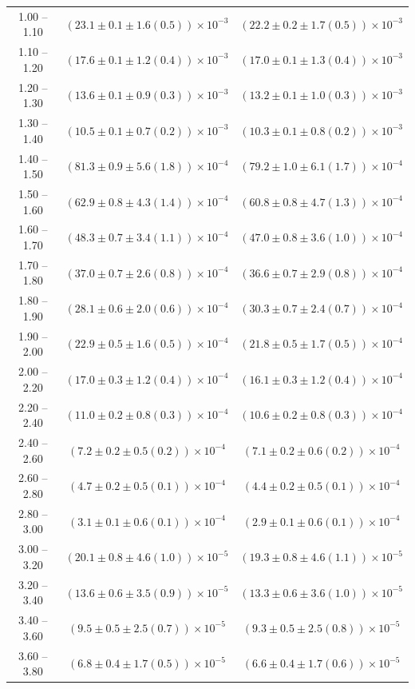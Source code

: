 \begin{table}
\begin{center}
\begin{tabular}{ c | c c }
1.00 -- 1.10 & $(23.1\pm0.1\pm1.6(0.5))\times10^{-3}$ & $(22.2\pm0.2\pm1.7(0.5))\times10^{-3}$ \\ 
1.10 -- 1.20 & $(17.6\pm0.1\pm1.2(0.4))\times10^{-3}$ & $(17.0\pm0.1\pm1.3(0.4))\times10^{-3}$ \\ 
1.20 -- 1.30 & $(13.6\pm0.1\pm0.9(0.3))\times10^{-3}$ & $(13.2\pm0.1\pm1.0(0.3))\times10^{-3}$ \\ 
1.30 -- 1.40 & $(10.5\pm0.1\pm0.7(0.2))\times10^{-3}$ & $(10.3\pm0.1\pm0.8(0.2))\times10^{-3}$ \\ 
1.40 -- 1.50 & $(81.3\pm0.9\pm5.6(1.8))\times10^{-4}$ & $(79.2\pm1.0\pm6.1(1.7))\times10^{-4}$ \\ 
1.50 -- 1.60 & $(62.9\pm0.8\pm4.3(1.4))\times10^{-4}$ & $(60.8\pm0.8\pm4.7(1.3))\times10^{-4}$ \\ 
1.60 -- 1.70 & $(48.3\pm0.7\pm3.4(1.1))\times10^{-4}$ & $(47.0\pm0.8\pm3.6(1.0))\times10^{-4}$ \\ 
1.70 -- 1.80 & $(37.0\pm0.7\pm2.6(0.8))\times10^{-4}$ & $(36.6\pm0.7\pm2.9(0.8))\times10^{-4}$ \\ 
1.80 -- 1.90 & $(28.1\pm0.6\pm2.0(0.6))\times10^{-4}$ & $(30.3\pm0.7\pm2.4(0.7))\times10^{-4}$ \\ 
1.90 -- 2.00 & $(22.9\pm0.5\pm1.6(0.5))\times10^{-4}$ & $(21.8\pm0.5\pm1.7(0.5))\times10^{-4}$ \\ 
2.00 -- 2.20 & $(17.0\pm0.3\pm1.2(0.4))\times10^{-4}$ & $(16.1\pm0.3\pm1.2(0.4))\times10^{-4}$ \\ 
2.20 -- 2.40 & $(11.0\pm0.2\pm0.8(0.3))\times10^{-4}$ & $(10.6\pm0.2\pm0.8(0.3))\times10^{-4}$ \\ 
2.40 -- 2.60 & $(7.2\pm0.2\pm0.5(0.2))\times10^{-4}$ & $(7.1\pm0.2\pm0.6(0.2))\times10^{-4}$ \\ 
2.60 -- 2.80 & $(4.7\pm0.2\pm0.5(0.1))\times10^{-4}$ & $(4.4\pm0.2\pm0.5(0.1))\times10^{-4}$ \\ 
2.80 -- 3.00 & $(3.1\pm0.1\pm0.6(0.1))\times10^{-4}$ & $(2.9\pm0.1\pm0.6(0.1))\times10^{-4}$ \\ 
3.00 -- 3.20 & $(20.1\pm0.8\pm4.6(1.0))\times10^{-5}$ & $(19.3\pm0.8\pm4.6(1.1))\times10^{-5}$ \\ 
3.20 -- 3.40 & $(13.6\pm0.6\pm3.5(0.9))\times10^{-5}$ & $(13.3\pm0.6\pm3.6(1.0))\times10^{-5}$ \\ 
3.40 -- 3.60 & $(9.5\pm0.5\pm2.5(0.7))\times10^{-5}$ & $(9.3\pm0.5\pm2.5(0.8))\times10^{-5}$ \\ 
3.60 -- 3.80 & $(6.8\pm0.4\pm1.7(0.5))\times10^{-5}$ & $(6.6\pm0.4\pm1.7(0.6))\times10^{-5}$ \\ 

\end{tabular}
\end{center}
\end{table}
